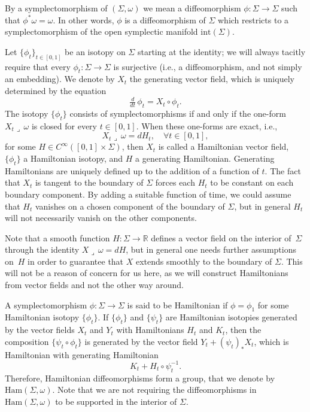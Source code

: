 \documentclass[11pt]{article}
\newcommand{\ie}{i.e.,\xspace}
\numberwithin{equation}{section}
\let\mathds\mathbb
\theoremstyle{definition}
\newcommand{\Ham}{\mathrm{Ham}}
\newcommand{\R}{\mathds{R}}
\begin{document}
By a symplectomorphism of $(\Sigma,\omega)$ we mean a diffeomorphism $\phi: \Sigma \to \Sigma$ such that $\phi^* \omega = \omega$. In other words, $\phi$ is a diffeomorphism of $\Sigma$ which restricts to a symplectomorphism of the open symplectic manifold $\mathrm{int}(\Sigma)$.

Let $\{\phi_t\}_{t\in [0,1]}$ be an isotopy on $\Sigma$ starting at the identity; we will always tacitly require that every $\phi_t:\Sigma\to\Sigma$ is surjective (\ie a diffeomorphism, and not simply an embedding). We denote by $X_t$ the generating vector field, which is uniquely determined by the equation
\[
\tfrac{d}{dt}\, \phi_t = X_t\circ\phi_t.
\]
The isotopy $\{\phi_t\}$ consists of symplectomorphisms if and only if the one-form $X_t \lrcorner \,\omega$ is closed for every $t\in [0,1]$. When these one-forms are exact, \ie
\[
X_t \lrcorner \,\omega = dH_t, \quad \forall t\in [0,1],
\]
for some $H\in C^{\infty}([0,1]\times \Sigma)$, then $X_t$ is called a Hamiltonian vector field, $\{\phi_t\}$ a Hamiltonian isotopy, and $H$ a generating Hamiltonian. Generating Hamiltonians are uniquely defined up to the addition of a function of $t$. The fact that $X_t$ is tangent to the boundary of $\Sigma$ forces each $H_t$ to be constant on each boundary component. By adding a suitable function of time, we could assume that $H_t$ vanishes on a chosen component of the boundary of $\Sigma$, but in general $H_t$ will not necessarily vanish on the other components.

Note that a smooth function $H:\Sigma\to\R$ defines a vector field on the interior of~$\Sigma$ through the identity $X \lrcorner \,\omega = dH$, but in general one needs further assumptions on~$H$ in order to guarantee that $X$ extends smoothly to the boundary of $\Sigma$. This will not be a reason of concern for us here, as we will construct Hamiltonians from vector fields and not the other way around.

A symplectomorphism $\phi: \Sigma \to \Sigma$ is said to be Hamiltonian if $\phi=\phi_1$ for some Hamiltonian isotopy $\{\phi_t\}$. If $\{\phi_t\}$ and $\{\psi_t\}$ are Hamiltonian isotopies generated by the vector fields $X_t$ and $Y_t$ with Hamiltonians $H_t$ and $K_t$, then the composition $\{\psi_t \circ \phi_t\}$ is generated by the vector field $Y_t + (\psi_t)_* X_t$, which is Hamiltonian with generating Hamiltonian
\begin{equation}
\label{hamprod}
K_t + H_t \circ \psi_t^{-1}.
\end{equation}
Therefore, Hamiltonian diffeomorphisms form a group, that we denote by~$\Ham(\Sigma,\omega)$. Note that we are not requiring the diffeomorphisms in $\Ham(\Sigma,\omega)$ to be supported in the interior of $\Sigma$.
\end{document}
